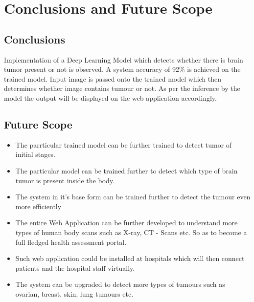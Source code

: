 \chapter{Conclusions and Future Scope}
\section{Conclusions }
Implementation of a Deep Learning Model which detects whether there is brain tumor present or not is observed. A system accuracy of 92\% is achieved on the trained model. Input image is passed onto the trained model which then determines whether image contains tumour or not. As per the inference by the model the output will be displayed on the web application accordingly.
\section{Future Scope }
\begin{itemize}
    \item The parrticular trained model can be further trained to detect tumor of initial stages.
    \item The particular model can be trained further to detect which type of brain tumor is present inside the body.
    \item The system in it’s base form can be trained further to detect the tumour even more efficiently
    \item The entire Web Application can be further developed to understand more types of human body scans such as X-ray, CT - Scans etc. So as to become a full fledged health assessment portal.
    \item Such web application could be installed at hospitals which will then connect patients and the hospital staff virtually.
    \item The system can be upgraded to detect more types of tumours such as ovarian, breast, skin, lung tumours etc.
\end{itemize}
